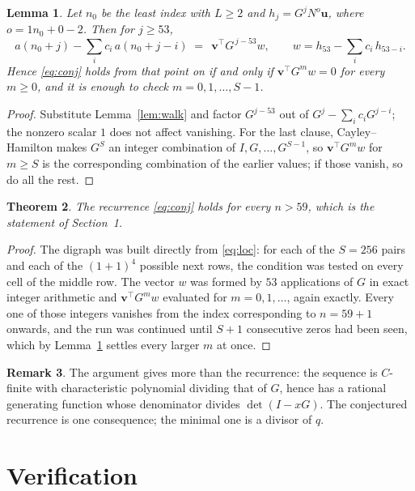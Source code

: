 \documentclass[11pt,a4paper]{article}
\theoremstyle{plain}
\newtheorem{theorem}{Theorem}
\newtheorem{lemma}[theorem]{Lemma}
\theoremstyle{definition}
\newtheorem{remark}[theorem]{Remark}
\begin{document}
\begin{lemma}\label{lem:crit}
Let $n_0$ be the least index with $L\ge2$ and $h_j=G^{j}N^{o}\mathbf{u}$, where
$o=1n_0+0-2$. Then for $j\ge53$,
\[
a(n_0+j)-\sum_i c_i\,a(n_0+j-i)\;=\;\,\mathbf{v}^{\!\top}G^{\,j-53}w,
\qquad w=h_{53}-\sum_i c_i\,h_{53-i} .
\]
Hence \eqref{eq:conj} holds from that point on if and only if
$\mathbf{v}^{\!\top}G^{m}w=0$ for every $m\ge0$, and it is enough to check
$m=0,1,\dots,S-1$.
\end{lemma}

\begin{proof}
Substitute Lemma~\ref{lem:walk} and factor $G^{j-53}$ out of
$G^{j}-\sum_ic_iG^{j-i}$; the nonzero scalar $1$ does not affect
vanishing. For the last clause, Cayley--Hamilton makes $G^{S}$ an integer combination of
$I,G,\dots,G^{S-1}$, so $\mathbf{v}^{\!\top}G^{m}w$ for $m\ge S$ is the corresponding
combination of the earlier values; if those vanish, so do all the rest.
\end{proof}

\begin{theorem}
The recurrence \eqref{eq:conj} holds for every $n>59$, which is the statement of
Section~1.
\end{theorem}

\begin{proof}
The digraph was built directly from \eqref{eq:loc}: for each of the $S=256$ pairs and each
of the $(1+1)^{4}$ possible next rows, the condition was tested on every cell of
the middle row. The vector $w$ was formed by $53$ applications of $G$ in exact integer
arithmetic and $\mathbf{v}^{\!\top}G^{m}w$ evaluated for $m=0,1,\dots$, again exactly.
Every one of those integers vanishes from the index corresponding to $n=59+1$ onwards,
and the run was continued until $S+1$ consecutive zeros had been seen, which by
Lemma~\ref{lem:crit} settles every larger $m$ at once.
\end{proof}

\begin{remark}
The argument gives more than the recurrence: the sequence is $C$-finite with characteristic
polynomial dividing that of $G$, hence has a rational generating function whose denominator
divides $\det(I-xG)$. The conjectured recurrence is one consequence; the minimal one is a
divisor of $q$.
\end{remark}

\section{Verification}
\end{document}
